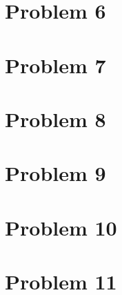 \documentclass[paper=a4, fontsize=11pt]{scrartcl} %
\numberwithin{equation}{section} %
\numberwithin{figure}{section} %
\numberwithin{table}{section} %
\begin{document}

\section{Problem 6}


\section{Problem 7}


\section{Problem 8}


\section{Problem 9}


\section{Problem 10}


\section{Problem 11}
\end{document}
